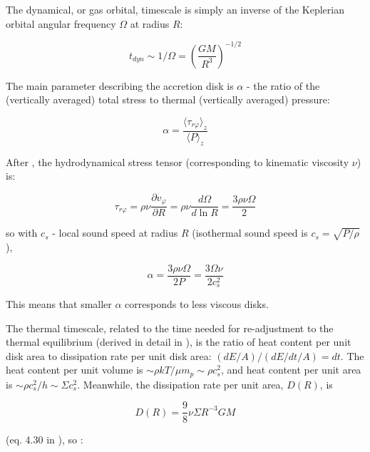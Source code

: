 \documentclass[twocolumn]{aastex62}
\begin{document}
The dynamical, or gas orbital, timescale is simply  an inverse of the Keplerian orbital angular frequency $ \Omega$  at radius $R$: 

\begin{equation}
t_{dyn} {\sim}  1 / \Omega = \left( \frac{GM}{R^{3}}\right)^{-1/2}
\end{equation}


The main parameter  describing the accretion disk is $\alpha$ - the ratio of the (vertically averaged) total stress to thermal (vertically averaged) pressure: 

\begin{equation}
\alpha= \frac{\langle \tau_{r\varphi}  \rangle_{z} }{\langle P \rangle _{z}} 
\end{equation}


After \cite{lasota2016},  the hydrodynamical stress tensor (corresponding to  kinematic viscosity $\nu$) is:

\begin{equation}
\tau_{r\varphi } = \rho \nu \frac{\partial v_{\varphi}}{\partial R} = \rho \nu \frac{d \Omega}{d \ln{R}} = \frac{3 \rho \nu \Omega}{2}  
\end{equation}

so  with  $c_{s}$ -  local sound speed at radius $R$ (isothermal sound speed is $c_{s} = \sqrt{P/\rho}$),

\begin{equation}
\alpha  =   \frac{3 \rho \nu \Omega}{2 P} =  \frac{3 \Omega \nu}{2 c_{s}^{2}}
\end{equation}



This means that smaller $\alpha$ corresponds to less viscous disks. 


The thermal timescale, related to the time needed for re-adjustment to the thermal equilibrium (derived in detail in \citealt{frank2002}), is the ratio of heat content per unit disk area to dissipation rate per unit disk area: $(dE / A) / (dE/dt /  A) = dt $.  The heat content per unit volume is ${\sim} \rho k T / \mu m_{p} {\sim} \rho c_{s}^{2}$, and heat content per unit area is  ${\sim} \rho c_{s}^{2} / h {\sim} \Sigma c_{s}^{2}$. Meanwhile, the dissipation rate per unit area, $D(R)$, is 

\begin{equation}
D(R) = \frac{9}{8} \nu \Sigma R^{-3} G M
\end{equation}

(eq. 4.30 in \citealt{frank2002}), so :
\end{document}
